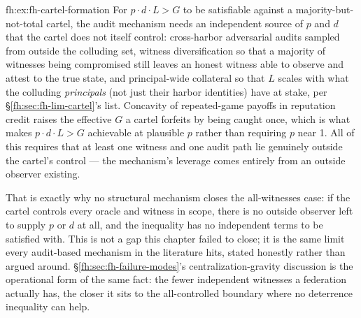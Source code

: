 \begin{pdSolution}{fh:ex:fh-cartel-formation}
For $p\cdot d\cdot L>G$ to be satisfiable against a majority-but-not-total cartel, the audit mechanism needs an independent source of $p$ and $d$ that the cartel does not itself control: cross-harbor adversarial audits sampled from outside the colluding set, witness diversification so that a majority of witnesses being compromised still leaves an honest witness able to observe and attest to the true state, and principal-wide collateral so that $L$ scales with what the colluding \emph{principals} (not just their harbor identities) have at stake, per \S\ref{fh:sec:fh-lim-cartel}'s list. Concavity of repeated-game payoffs in reputation credit raises the effective $G$ a cartel forfeits by being caught once, which is what makes $p\cdot d\cdot L>G$ achievable at plausible $p$ rather than requiring $p$ near 1. All of this requires that at least one witness and one audit path lie genuinely outside the cartel's control --- the mechanism's leverage comes entirely from an outside observer existing.

That is exactly why no structural mechanism closes the all-witnesses case: if the cartel controls every oracle and witness in scope, there is no outside observer left to supply $p$ or $d$ at all, and the inequality has no independent terms to be satisfied with. This is not a gap this chapter failed to close; it is the same limit every audit-based mechanism in the literature hits, stated honestly rather than argued around. \S\ref{fh:sec:fh-failure-modes}'s centralization-gravity discussion is the operational form of the same fact: the fewer independent witnesses a federation actually has, the closer it sits to the all-controlled boundary where no deterrence inequality can help.
\end{pdSolution}
